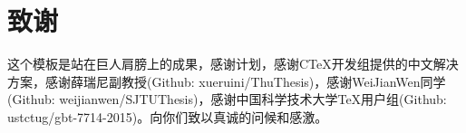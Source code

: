 \chapter{致\ccwd{}谢}	%
这个模板是站在巨人肩膀上的成果，感谢\LaTeXe{}计划，感谢CTeX开发组提供的中文解决方案，感谢薛瑞尼副教授(Github: xueruini/ThuThesis)，感谢WeiJianWen同学(Github: weijianwen/SJTUThesis)，感谢中国科学技术大学TeX用户组(Github: ustctug/gbt-7714-2015)。向你们致以真诚的问候和感激。
